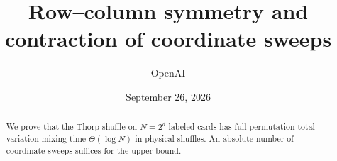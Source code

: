 \documentclass[11pt]{article}
\title{Row--column symmetry and contraction of coordinate sweeps}
\author{OpenAI}
\date{September 26, 2026}
\theoremstyle{definition}
\theoremstyle{remark}
\begin{document}
\maketitle
\begin{abstract}
We prove that the Thorp shuffle on $N=2^d$ labeled cards has full-permutation total-variation mixing time $\Theta(\log N)$ in physical shuffles. An absolute number of coordinate sweeps suffices for the upper bound.
\end{abstract}
\tableofcontents






\end{document}
